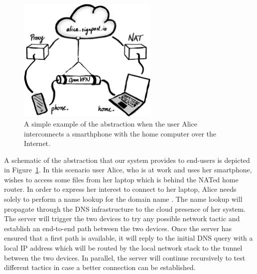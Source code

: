 \begin{figure}[ht]
  \begin{center}
	\includegraphics[width=0.6\textwidth]{signpost-illustration}
  \end{center}
  \caption{A simple example of the \signpost abstraction when the user Alice
    interconnects a smarthphone with the home computer over the Internet.}
  \label{fig:signpost-user-abstraction}
\end{figure}
A schematic of the abstraction that our system provides to end-users is depicted
in Figure~\ref{fig:signpost-user-abstraction}. In this scenario user Alice, who
is at work and uses her smartphone, wishes to access some files from her laptop
which is behind the NATed home router. In order to express her interest to
connect to her laptop, Alice needs solely to perform a name lookup for the
domain name . The name lookup will propagate through the
DNS infrastructure to the cloud presence of her \signpost system. The \signpost
server will trigger the two devices to try any possible network tactic and
establish an end-to-end path between the two devices. Once the server has
ensured that a first path is available, it will reply to the initial
DNS query with a local IP address which will be routed by the local network
stack to the tunnel between the two devices. In parallel, the server will
continue recursively to test different tactics in case a better connection can
be established. 


